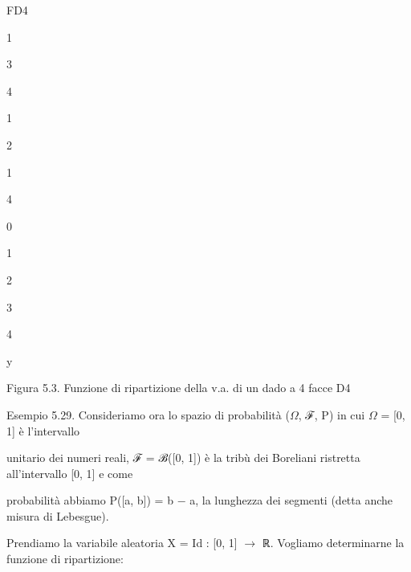 \documentclass[a4paper,portrait,12pt]{article}
\begin{document}
\begin{flushleft}
FD4
\end{flushleft}


1


3


4


1


2


1


4





0





1





2





3





4





\begin{flushleft}
y
\end{flushleft}





\begin{flushleft}
Figura 5.3. Funzione di ripartizione della v.a. di un dado a 4 facce D4
\end{flushleft}





\begin{flushleft}
Esempio 5.29. Consideriamo ora lo spazio di probabilit\`{a} ($\Omega$, ℱ, P) in cui $\Omega$ = [0, 1] \`{e} l'intervallo
\end{flushleft}


\begin{flushleft}
unitario dei numeri reali, ℱ = ℬ([0, 1]) \`{e} la tribù dei Boreliani ristretta all'intervallo [0, 1] e come
\end{flushleft}


\begin{flushleft}
probabilit\`{a} abbiamo P([a, b]) = b $-$ a, la lunghezza dei segmenti (detta anche misura di Lebesgue).
\end{flushleft}


\begin{flushleft}
Prendiamo la variabile aleatoria X = Id : [0, 1] $\rightarrow$ ℝ. Vogliamo determinarne la funzione di ripartizione:
\end{flushleft}
\end{document}
